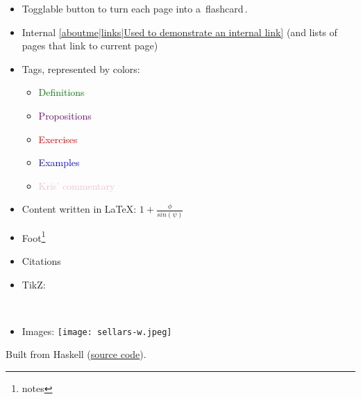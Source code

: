 \begin{itemize}
	\item Togglable button to turn each page into a \,flashcard\,.
	\item Internal \ref{aboutme|links|Used to demonstrate an internal link} (and lists of pages that link to current page)
	\item Tags, represented by colors: \begin{itemize}
		\item \textcolor{green}{Definitions}
		\item \textcolor{purple}{Propositions}
		\item \textcolor{red}{Exercises}
		\item \textcolor{blue}{Examples}
		\item \textcolor{pink}{Kris' commentary}
		\end{itemize}
	\item Content written in \LaTeX: $1+\frac{\phi}{sin(\psi)}$
	\item Foot\footnote{notes}
	\item Citations \cite{mazieres2005get}
	\item TikZ: \
	\item Images: \texttt{[image: sellars-w.jpeg]}

\end{itemize}

Built from Haskell (\href{https://github.com/kris-brown/KBKB}{source code}).